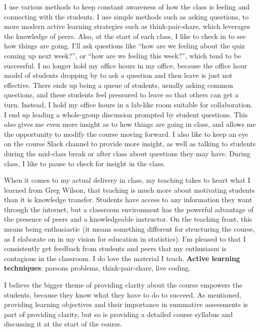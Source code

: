 \documentclass[]{book}
\begin{document}
I use various methods to keep constant awareness of how the class is feeling and connecting with the students. I use simple methods such as asking questions, to more modern active learning strategies such as think-pair-share, which leverages the knowledge of peers. Also, at the start of each class, I like to check in to see how things are going. I'll ask questions like ``how are we feeling about the quiz coming up next week?'', or ``how are we feeling this week?'', which tend to be successful. I no longer hold my office hours in my office, because the office hour model of students dropping by to ask a question and then leave is just not effective. There ends up being a queue of students, usually asking common questions, and these students feel pressured to leave so that others can get a turn. Instead, I hold my office hours in a lab-like room suitable for collaboration. I end up leading a whole-group discussion prompted by student questions. This also gives me even more insight as to how things are going in class, and allows me the opportunity to modify the course moving forward. I also like to keep an eye on the course Slack channel to provide more insight, as well as talking to students during the mid-class break or after class about questions they may have. During class, I like to pause to check for insight in the class.

When it comes to my actual delivery in class, my teaching takes to heart what I learned from Greg Wilson, that teaching is much more about motivating students than it is knowledge transfer. Students have access to any information they want through the internet, but a classroom environment has the powerful advantage of the presence of peers and a knowledgeable instructor. On the teaching front, this means being enthusiastic (it means something different for structuring the course, as I elaborate on in my vision for education in statistics). I'm pleased to that I consistently get feedback from students and peers that my enthusiasm is contagious in the classroom. I do love the material I teach. \textbf{Active learning techniques}: parsons problems, think-pair-share, live coding.

I believe the bigger theme of providing clarity about the course empowers the students, because they know what they have to do to succeed. As mentioned, providing learning objectives and their importance in summative assessments is part of providing clarity, but so is providing a detailed course syllabus and discussing it at the start of the course.
\end{document}
